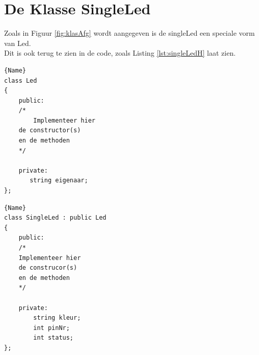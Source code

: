 \newpage
\section{De Klasse SingleLed} \label{sec:singleLed}

Zoals in Figuur \ref{fig:klasAfg} wordt aangegeven is de singleLed een speciale vorm van Led. \\Dit is ook terug te zien in de code, zoals Listing \ref{lst:singleLedH} laat zien.

\noindent\begin{minipage}{.45\textwidth}
\begin{lstlisting}[caption=LED declaratie file(.h),frame=tlrb,label={lst:ledBaseH}]{Name}
class Led
{
	public:
	/*
		Implementeer hier 
	de constructor(s) 
	en de methoden
	*/
	
	private:
       string eigenaar;
};
\end{lstlisting}
\end{minipage}\hfill
\begin{minipage}{.45\textwidth}
\begin{lstlisting}[caption=SingleLed declaratie file(.h),frame=tlrb,label={lst:singleLedH}]{Name}
class SingleLed : public Led
{
	public:
	/*
	Implementeer hier 
	de construcor(s) 
	en de methoden
	*/

	private:
        string kleur;
	    int pinNr;
	    int status;
};
\end{lstlisting}
\end{minipage}
